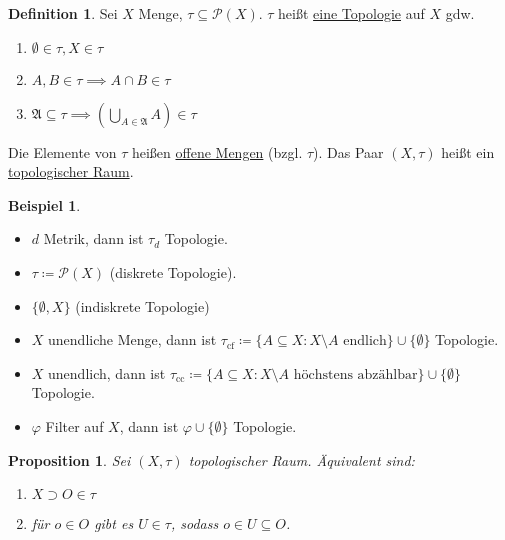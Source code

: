 \documentclass[12pt]{scrartcl}%
\newtheorem{prop}{Proposition}
\theoremstyle{definition}
\newtheorem*{defn}{Definition}
\newtheorem{bsp}{Beispiel}
\theoremstyle{remark}
\newcommand{\powerset}{\mathcal{P}}
\begin{document}
\begin{defn}
    Sei $X$ Menge, $\tau\subseteq \powerset(X)$. $\tau$ heißt \underline{eine Topologie} auf $X$ gdw.

    \begin{enumerate}[label=(\arabic*)]
        \item $\emptyset\in\tau, X\in\tau$
        \item $A,B\in\tau \implies A\cap B\in \tau$
        \item $\mathfrak{A}\subseteq \tau \implies \left(\bigcup_{A\in\mathfrak{A}} A\right) \in \tau$
    \end{enumerate}

    Die Elemente von $\tau$ heißen \underline{offene Mengen} (bzgl. $\tau$). Das Paar $(X,\tau)$ heißt ein \underline{topologischer Raum}. %
\end{defn}

\begin{bsp}
    \begin{itemize}
        \item $d$ Metrik, dann ist $\tau_d$ Topologie.
        \item $\tau\coloneqq \powerset(X)$ (diskrete Topologie).
        \item $\{\emptyset, X\}$ (indiskrete Topologie)
        \item $X$ unendliche Menge, dann ist $\tau_\text{cf}\coloneqq \{ A\subseteq X: X\setminus A \text{ endlich} \} \cup \{\emptyset\}$ Topologie.
        \item $X$ unendlich, dann ist $\tau_\text{cc} \coloneqq \{ A\subseteq X: X\setminus A \text{ höchstens abzählbar}\} \cup \{\emptyset\}$ Topologie.
        \item $\varphi$ Filter auf $X$, dann ist $\varphi\cup \{\emptyset\}$ Topologie.
    \end{itemize}
\end{bsp}

\begin{prop}
    Sei $(X, \tau)$ topologischer Raum. Äquivalent sind:

    \begin{enumerate}[label=(\arabic*)]
        \item $X\supset O\in \tau$
        \item für $o\in O$ gibt es $U\in\tau$, sodass $o\in U\subseteq O$.
    \end{enumerate}
\end{prop}
\end{document}
